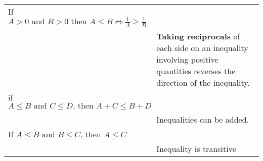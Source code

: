 \begin{small}
\begin{tabularx}{1\textwidth}{
            p{}
            p{}
        }
        If $ A > 0 \text{ and } B > 0 \text{ then } A \leq B \iff \frac{1}{A} \geq \frac{1}{B}$
        \\
        &
        \textbf{Taking reciprocals} of each side on an inequality involving
        positive quantities reverses the direction of the inequality.
        \\
        \midrule

        if $A \leq B \text{ and } C \leq D \text{, then } A + C \leq B + D $
        \\
        &
        Inequalities can be added.
        \\
        \midrule

        If $ A \leq B \text{ and } B \leq C \text{, then } A \leq C $
        \\ 
        &
        Inequality is transitive
        \\
        \bottomrule
    \end{tabularx}
\end{small}
